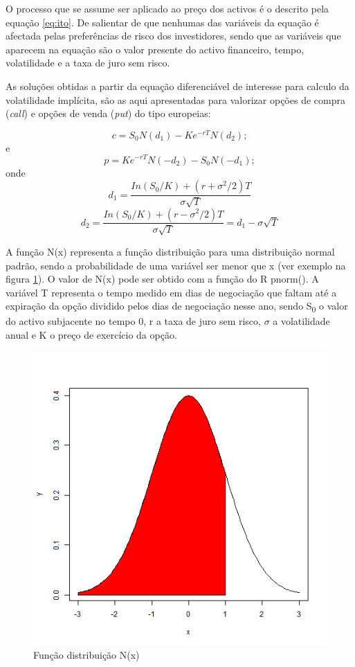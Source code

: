 \documentclass[
  12pt,
  a4paper,
  openany]{book}
\begin{document}
O processo que se assume ser aplicado ao preço dos activos é o descrito pela equação \eqref{eq:ito}. De salientar de que nenhumas das variáveis da equação é afectada pelas preferências de risco dos investidores, sendo que as variáveis que aparecem na equação são o valor presente do activo financeiro, tempo, volatilidade e a taxa de juro sem risco.

As soluções obtidas a partir da equação diferenciável de interesse para calculo da volatilidade implícita, são as aqui apresentadas para valorizar opções de compra (\emph{call}) e opções de venda (\emph{put}) do tipo europeias:

\begin{equation} 
  c = S_0N(d_1) - Ke^{-rT}N(d_2);
  \label{eq:call}
\end{equation}
e
\begin{equation} 
  p = Ke^{-rT}N(-d_2) - S_0N(-d_1);
  \label{eq:put}
\end{equation}
onde
\begin{equation} 
  d_1 = \frac{In(S_0/K)+(r+\sigma^2/2)T}{\sigma\sqrt{T}}
  \label{eq:d1}
\end{equation}
\begin{equation} 
  d_2 = \frac{In(S_0/K)+(r-\sigma^2/2)T}{\sigma\sqrt{T}}=d_1-\sigma\sqrt{T}
  \label{eq:d2}
\end{equation}

A função N(x) representa a função distribuição para uma distribuição normal padrão, sendo a probabilidade de uma variável ser menor que x (ver exemplo na figura \ref{fig:fdistribuicao}). O valor de N(x) pode ser obtido com a função do R pnorm(). A variável T representa o tempo medido em dias de negociação que faltam até a expiração da opção dividido pelos dias de negociação nesse ano, sendo S\textsubscript{0} o valor do activo subjacente no tempo 0, r a taxa de juro sem risco, \(\sigma\) a volatilidade anual e K o preço de exercício da opção.

\begin{figure}

{\centering \includegraphics[width=0.45\linewidth]{image/fdistribuicao} 

}

\caption{Função distribuição N(x)}\label{fig:fdistribuicao}
\end{figure}
\FloatBarrier
\centering
\end{document}
